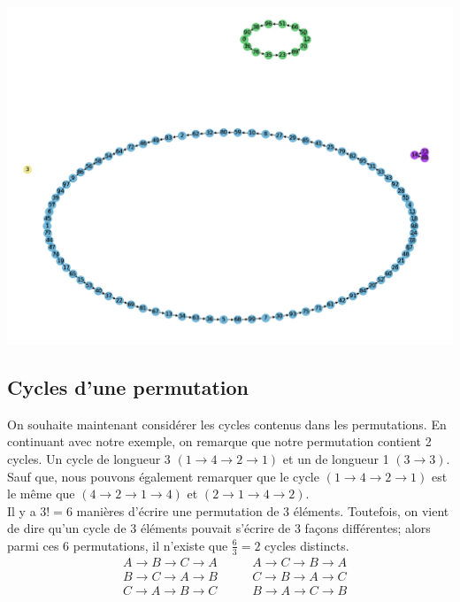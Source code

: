 	\begin{center}
		\includegraphics[scale=0.4]{Figure_1}
	\end{center}

\subsection{Cycles d'une permutation}

	On souhaite maintenant considérer les cycles contenus dans les permutations.
	En continuant avec notre exemple, on remarque que notre permutation contient 2 cycles.
	Un cycle de longueur 3 $(1 \rightarrow 4 \rightarrow 2 \rightarrow 1)$ et un de longueur 1 $(3 \rightarrow 3)$.
	Sauf que, nous pouvons également remarquer que le cycle $(1 \rightarrow 4 \rightarrow 2 \rightarrow 1)$ est le même que $(4 \rightarrow 2 \rightarrow 1 \rightarrow 4)$ et $(2 \rightarrow 1 \rightarrow 4 \rightarrow 2)$. \\
	Il y a $3! = 6$ manières d'écrire une permutation de 3 éléments.
	Toutefois, on vient de dire qu'un cycle de 3 éléments pouvait s'écrire de 3 façons différentes; alors parmi ces $6$ permutations, il n'existe que $\frac{6}{3} = 2$ cycles distincts.
	\begin{align*}
		 & A \rightarrow B \rightarrow C \rightarrow A \qquad & A \rightarrow C  \rightarrow B \rightarrow A \\
		 & B \rightarrow C \rightarrow A \rightarrow B \qquad & C \rightarrow B  \rightarrow A \rightarrow C \\
		 & C \rightarrow A \rightarrow B \rightarrow C \qquad & B \rightarrow A  \rightarrow C \rightarrow B
	\end{align*}


